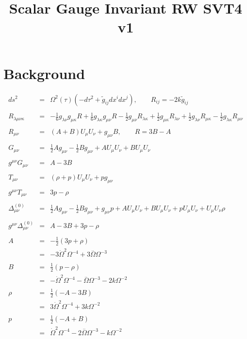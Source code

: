 \documentclass[10pt,letterpaper]{article}
\title{Scalar Gauge Invariant RW SVT4 v1}
\date{}
\numberwithin{equation}{section}
\begin{document}
 
\maketitle
\noindent 


\section{Background}
%
%
\begin{eqnarray}
ds^2 &=& \Omega^2(\tau)\left(-d\tau^2 +\tilde g_{ij} dx^i dx^j\right),\qquad R_{ij} = -2k \tilde g_{ij}
\label{geom2}
\\ \nonumber\\
R_{\lambda\mu\nu\kappa} &=&- \tfrac{1}{6} g_{\lambda \nu } g_{\mu \kappa } R + \tfrac{1}{6} g_{\lambda \kappa } g_{\mu \nu } R -  \tfrac{1}{2} g_{\mu \nu } R_{\lambda \kappa } + \tfrac{1}{2} g_{\mu \kappa } R_{\lambda \nu } + \tfrac{1}{2} g_{\lambda \nu } R_{\mu \kappa } -  \tfrac{1}{2} g_{\lambda \kappa } R_{\mu \nu }
\\ \nonumber\\
R_{\mu\nu} &=& (A+B)U_\mu U_\nu + g_{\mu\nu}B,\qquad R=3B-A
\label{Ricci}
\\ \nonumber\\
G_{\mu\nu}&=& \tfrac{1}{2} A g_{\mu \nu } -  \tfrac{1}{2} B g_{\mu \nu } + A U_{\mu } U_{\nu } + B U_{\mu } U_{\nu }
\\  \nonumber\\ 
g^{\mu\nu}G_{\mu\nu}&=& A - 3 B
\\ \nonumber\\
T_{\mu\nu} &=& (\rho+p)U_\mu U_\nu +  p g_{\mu\nu}
\\ \nonumber\\
g^{\mu\nu}T_{\mu\nu} &=& 3p-\rho
\\ \nonumber\\
\Delta_{\mu\nu}^{(0)}&=&\tfrac{1}{2} A g_{\mu \nu } -  \tfrac{1}{2} B g_{\mu \nu } + g_{\mu \nu } p + A U_{\mu } U_{\nu } + B U_{\mu } U_{\nu } + p U_{\mu } U_{\nu } + U_{\mu } U_{\nu } \rho 
\label{Delta}
\\ \nonumber\\
g^{\mu\nu}\Delta_{\mu\nu}^{(0)}&=& A - 3 B + 3 p -  \rho 
\label{Delta4tr}
\\ \nonumber\\
A &=& -\tfrac12 (3p+\rho)
\nonumber\\
&=& -3 \dot{\Omega}^2 \Omega^{-4} + 3 \overset{..}{\Omega} \Omega^{-3}
\\ \nonumber\\
B&=& \tfrac12(p-\rho)
\nonumber\\
&=& - \dot{\Omega}^2 \Omega^{-4} -  \overset{..}{\Omega} \Omega^{-3} - 2 k \Omega^{-2}
\\ \nonumber\\
\rho &=& \tfrac{1}{2} (- A - 3 B)
\nonumber\\
&=& 3 \dot{\Omega}^2 \Omega^{-4} + 3 k \Omega^{-2}
\\ \nonumber\\
p &=& \tfrac{1}{2} (- A + B)
\nonumber\\
&=& \dot{\Omega}^2 \Omega^{-4} - 2 \overset{..}{\Omega} \Omega^{-3} -  k \Omega^{-2}
\end{eqnarray}
%
%
\end{document}
